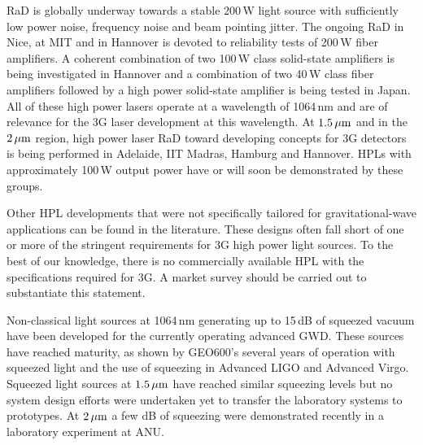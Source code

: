 \ac{RaD} is globally underway towards a stable 200\,W light source with sufficiently low power noise, frequency noise and beam pointing jitter. 
The ongoing \ac{RaD} in Nice, at \ac{MIT} and in Hannover is devoted to reliability tests of 200\,W fiber amplifiers. A coherent combination of two 100\,W class solid-state amplifiers is being investigated in Hannover and a combination of two 40\,W class fiber amplifiers followed by a high power solid-state amplifier is being tested in Japan. All of these high power lasers operate at a wavelength of 1064\,nm and are of relevance for the \ac{3G}  laser development at this wavelength. At $ 1.5\, {\rm \mu m}$ and in the $ 2\, {\rm \mu m}$ region, high power laser \ac{RaD} toward developing concepts for \ac{3G}   detectors is being performed in Adelaide, \acs{IIT} Madras, Hamburg and Hannover. \acp{HPL} with approximately 100\,W output power have or will soon be demonstrated by these groups. 

Other \ac{HPL} developments that were not specifically tailored for gravitational-wave applications can be found in the literature. These designs often fall short of one or more of the stringent requirements for \ac{3G}   high power light sources. To the best of our knowledge, there is no commercially available \ac{HPL} with the specifications required for \ac{3G}. A market survey should be carried out to substantiate this statement.

Non-classical light sources at 1064\,nm generating up to 15\,dB of squeezed vacuum have been developed for the currently operating advanced \ac{GWD}. These sources have reached maturity, as shown by GEO600's several years of operation with squeezed light and the use of squeezing in Advanced LIGO and Advanced Virgo. Squeezed light sources at $ 1.5\, {\rm \mu m}$ have reached similar squeezing levels but no system design efforts were undertaken yet to transfer the laboratory systems to prototypes. At $ 2\, {\rm \mu m}$ a few dB of squeezing were demonstrated recently in a laboratory experiment at ANU.

